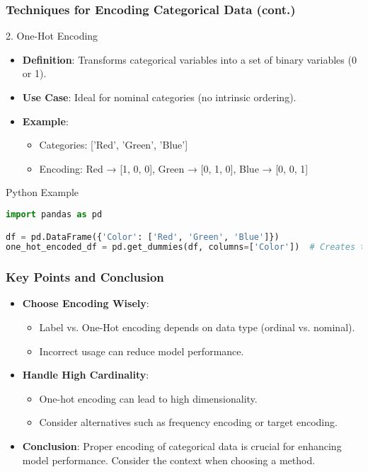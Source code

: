 \documentclass[aspectratio=169]{beamer}
\begin{document}
\begin{frame}
    \frametitle{Techniques for Encoding Categorical Data (cont.)}
    
    \begin{block}{2. One-Hot Encoding}
        \begin{itemize}
            \item \textbf{Definition}: Transforms categorical variables into a set of binary variables (0 or 1).
            \item \textbf{Use Case}: Ideal for nominal categories (no intrinsic ordering).
            \item \textbf{Example}:
            \begin{itemize}
                \item Categories: ['Red', 'Green', 'Blue']
                \item Encoding: Red → [1, 0, 0], Green → [0, 1, 0], Blue → [0, 0, 1]
            \end{itemize}
        \end{itemize}
    \end{block}
    
    \begin{block}{Python Example}
    \begin{lstlisting}[language=Python]
import pandas as pd

df = pd.DataFrame({'Color': ['Red', 'Green', 'Blue']})
one_hot_encoded_df = pd.get_dummies(df, columns=['Color'])  # Creates three binary columns
    \end{lstlisting}
    \end{block}
\end{frame}

\begin{frame}
    \frametitle{Key Points and Conclusion}
    \begin{itemize}
        \item \textbf{Choose Encoding Wisely}: 
        \begin{itemize}
            \item Label vs. One-Hot encoding depends on data type (ordinal vs. nominal).
            \item Incorrect usage can reduce model performance.
        \end{itemize}
        \item \textbf{Handle High Cardinality}: 
        \begin{itemize}
            \item One-hot encoding can lead to high dimensionality.
            \item Consider alternatives such as frequency encoding or target encoding.
        \end{itemize}
        \item \textbf{Conclusion}: Proper encoding of categorical data is crucial for enhancing model performance. Consider the context when choosing a method.
    \end{itemize}
\end{frame}
\end{document}
